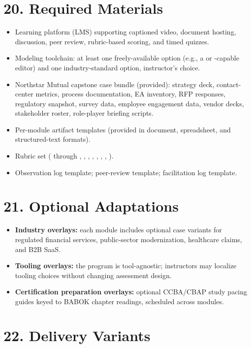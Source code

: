 \documentclass[11pt,letterpaper,oneside]{report}
\begin{document}
\section*{20. Required Materials}
\begin{itemize}
  \item Learning platform (LMS) supporting captioned video, document hosting, discussion, peer review, rubric-based scoring, and timed quizzes.
  \item Modeling toolchain: at least one freely-available option (e.g., a  or -capable editor) and one industry-standard option, instructor's choice.
  \item Northstar Mutual capstone case bundle (provided): strategy deck, contact-center metrics, process documentation, EA inventory, RFP responses, regulatory snapshot, survey data, employee engagement data, vendor decks, stakeholder roster, role-player briefing scripts.
  \item Per-module artifact templates (provided in document, spreadsheet, and structured-text formats).
  \item Rubric set ( through , , , , , , , ).
  \item Observation log template; peer-review template; facilitation log template.
\end{itemize}

\section*{21. Optional Adaptations}
\begin{itemize}
  \item \textbf{Industry overlays:} each module includes optional case variants for regulated financial services, public-sector modernization, healthcare claims, and B2B SaaS.
  \item \textbf{Tooling overlays:} the program is tool-agnostic; instructors may localize tooling choices without changing assessment design.
  \item \textbf{Certification preparation overlays:} optional CCBA/CBAP study pacing guides keyed to BABOK chapter readings, scheduled across modules.
\end{itemize}

\section*{22. Delivery Variants}
\end{document}
